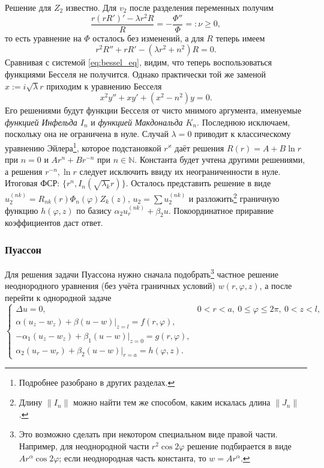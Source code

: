 
Решение для $ Z_2 $ известно. Для $ v_2 $ после разделения переменных получим 
\[
    \frac{r(rR')' - \lambda r^2 R}{R} = -\frac{\Phi''}{\Phi} =: \nu \geqslant 0,
  \]
то есть уравнение на $ \Phi $ осталось без изменений, а для $ R $ теперь
имеем
\[
    r^2R'' + rR' - (\lambda r^2 + n^2)R = 0.
\]
Сравнивая с системой \eqref{eq:bessel_eq}, видим, что теперь воспользоваться
функциями Бесселя не получится. Однако практически той же заменой $ x :=
i\sqrt\lambda r $ приходим к уравнению Бесселя 
\[
    x^2 y'' + x y' + (x^2 - n^2)y = 0.
\]
Его решениями будут функции Бесселя от чисто мнимого аргумента, именуемые
\emph{функцией Инфельда $ I_n $} и \emph{функцией Макдональда $ K_n $}.
Последнюю исключаем, поскольку она не ограничена в нуле. Случай $ \lambda = 0 $
приводит к классическому уравнению Эйлера\footnote{Подробнее разобрано в других
разделах.}, которое подстановкой $ r^\varkappa $ даёт решения $ R(r) = A + B\ln
r$ при $ n = 0 $ и $ Ar^{n} + Br^{-n} $ при $ n \in \mathbb N $. Константа будет
учтена другими решениями, а решения $ r^{-n}, \ln r $ следует исключить ввиду их
неограниченности в нуле. Итоговая ФСР: $ \{r^n, I_n(\sqrt{\lambda_k} r)\} $.
Осталось представить решение в виде $ u_2^{(nk)} = R_{nk}(r) \Phi_n(\varphi) Z_k(z)
$, $ u_2 = \sum u_2^{(nk)} $ и разложить\footnote{Длину $ \|I_n\| $ можно найти тем же способом, каким
искалась длина $ \|J_n\| $.}  граничную функцию $ h(\varphi, z)
$ по базису $ \alpha_2u_r^{(nk)} + \beta_2 u $. Покоординатное приравние
коэффициентов даст ответ.
\subsubsection{Пуассон}
Для решения задачи Пуассона нужно сначала подобрать\footnote{Это возможно
  сделать при некотором специальном виде правой части. Например, для неоднородной части $ r^2\cos 2\varphi $ решение подбирается в виде
$ Ar^\alpha\cos2\varphi $; если неоднородная часть константа, то $ w = Ar^\alpha
$.} частное решение
неоднородного уравнения
(без учёта граничных условий) $ w(r,\varphi, z) $, а после перейти к однородной
задаче
\[
  \begin{cases}
    \Delta u = 0, & 0 < r < a, \ 0\leqslant \varphi \leqslant 2\pi,
    \ 0 < z < l,\\
    \alpha (u_z - w_z) + \beta (u-w) \Big|_{z=l} = f(r, \varphi),\\
      -\alpha_1 (u_z - w_z) + \beta_1 (u - w)\Big|_{z=0} = g(r, \varphi),\\
      \alpha_2 (u_r - w_r) + \beta_2 (u-w) \Big|_{r=a} = h(\varphi, z).
  \end{cases}
\]
